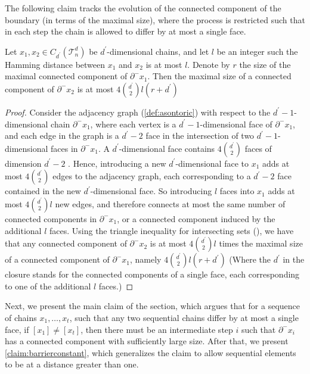 The following claim tracks the evolution of the connected component of the boundary (in terms of the maximal size), where the process is restricted such that in each step the chain is allowed to differ by at most a single face.
\begin{claim}
  \label{claim:mergebyf}
  Let $x_{1},x_{2} \in C_{d^{\prime}}(\mathcal{T}_n^d)$ be $d^{\prime}$-dimensional chains, and let $l$ be an integer such the Hamming distance between $x_{1}$ and $x_{2}$ is at most $l$. Denote by $r$ the size of the maximal connected component of $\partial^{-}x_{1}$. Then the maximal size of a connected component of $\partial^{-}x_{2}$ is at most $4{ d^{\prime} \choose 2 }l(r+d^{\prime}) $
\end{claim}
\begin{proof}
  Consider the adjacency graph (\cref{def:asontoric}) with respect to the $d^{\prime}-1$-dimensional chain $\partial^{-}x_{1}$, where each vertex is a $d^{\prime}-1$-dimensional face of $\partial^{-}x_{1}$, and each edge in the graph is a $d^{\prime}-2$ face in the intersection of two $d^{\prime}-1$-dimensional faces in $\partial^{-}x_{1}$. A $d^{\prime}$-dimensional face contains $4{ d^{\prime} \choose 2 }$ faces of dimension $d^{\prime}-2$ . Hence, introducing a new $d^{\prime}$-dimensional face to $x_{1}$ adds at most $4{ d^{\prime} \choose 2 }$ edges to the adjacency graph, each corresponding to a $d^{\prime}-2$ face contained in the new $d^{\prime}$-dimensional face. So introducing $l$ faces into $x_{1}$ adds at most $4 { d^{\prime} \choose 2 } l$ new edges, and therefore connects at most the same number of connected components in $\partial^{-}x_{1}$, or a connected component induced by the additional $l$ faces. Using the triangle inequality for intersecting sets (), we have that any connected component of $\partial^{-}x_{2}$ is at most $4{ d^{\prime} \choose 2 } l$ times the maximal size of a connected component of $\partial^{-}x_{1}$, namely $4 { d^{\prime} \choose 2 }l (r+d^{\prime})$ (Where the $d^{\prime}$ in the closure stands for the connected components of a single face, each corresponding to one of the additional $l$ faces.)
\end{proof}




Next, we present the main claim of the section, which argues that for a sequence of chains $x_{1}, \ldots, x_{t}$, such that any two sequential chains differ by at most a single face, if $[x_{1}] \neq [x_{t}]$, then there must be an intermediate step $i$ such that $\partial^{-}x_{i}$ has a connected component with sufficiently large size. After that, we present \cref{claim:barrierconstant}, which generalizes the claim to allow sequential elements to be at a distance greater than one.

